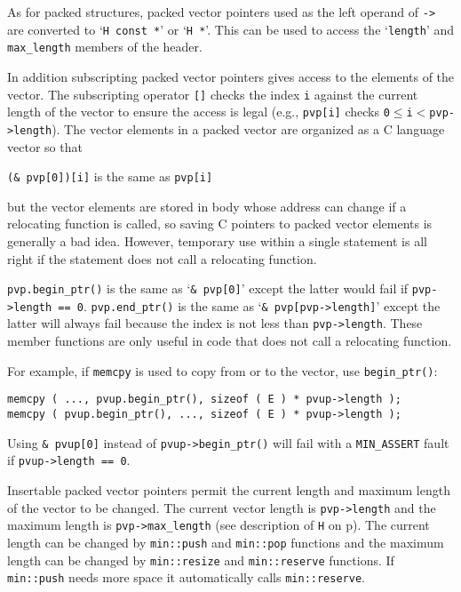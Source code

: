 \documentclass[12pt]{article}
\newcommand{\pagref}[1]{p\pageref{#1}}
\newcommand{\EOL}{\penalty \exhyphenpenalty}
\newenvironment{indpar}[1][0.3in]%
	{\begin{list}{}%
		     {\setlength{\itemsep}{0in}%
		      \setlength{\topsep}{0in}%
		      \setlength{\parsep}{1ex}%
		      \setlength{\labelwidth}{#1}%
		      \setlength{\leftmargin}{#1}%
		      \addtolength{\leftmargin}{\labelsep}}%
	 \item}%
	{\end{list}}
\begin{document}
As for packed structures, packed vector pointers used as the left
operand of \verb|->| are converted to
`\verb|H const *|' or
`\verb|H *|'.  This can be used to access the `\verb|length|'
and \verb|max_length| members of the header.

In addition subscripting packed vector
pointers gives access to the elements of the vector.  The subscripting
operator \verb|[]| checks the index \verb|i| against the current length
of the vector to ensure the access is legal (e.g., \verb|pvp[i]|
checks \verb|0|$\leq$\verb|i|$<$\verb|pvp->length|).
The vector elements in a
packed vector are organized as a C language vector so that
\begin{center}
\verb|(& pvp[0])[i]| is the same as \verb|pvp[i]|
\end{center}
but the vector elements are stored in body whose address can change
if a relocating function is called, so saving C pointers to packed vector
elements is generally a bad idea.  However, temporary use within a single
statement is all right if the statement does not call a relocating
function.

\verb|pvp.begin_ptr()| is the same as `\verb|& pvp[0]|'
except the latter would fail if {\tt pvp->\EOL length == 0}.
\verb|pvp.end_ptr()| is the same as `\verb|& pvp[pvp->length]|'
except the latter will always fail because the index is not less than
\verb|pvp->length|.
These member functions are only useful
in code that does not call a relocating function.

For example, if \verb|memcpy| is used to copy
from or to the vector, use {\tt begin\_\EOL ptr()}:
\begin{indpar}\begin{verbatim}
memcpy ( ..., pvup.begin_ptr(), sizeof ( E ) * pvup->length );
memcpy ( pvup.begin_ptr(), ..., sizeof ( E ) * pvup->length );
\end{verbatim}\end{indpar}
Using \verb|& pvup[0]| instead of \verb|pvup->begin_ptr()|
will fail with a {\tt MIN\_\EOL ASSERT} fault if {\tt pvup->\EOL length == 0}.

Insertable packed vector pointers permit the current length and maximum
length of the vector to be changed.
The current vector length is \verb|pvp->length| and the maximum
length is \verb|pvp->max_length| (see description of \verb|H| on
\pagref{PACKED_VEC_HEADER_TYPE}).
The current length can be changed by {\tt min::\EOL push} and
{\tt min::\EOL pop} functions and the maximum length can be changed
by {\tt min::\EOL resize} and {\tt min::\EOL reserve} functions.  If
{\tt min::\EOL push} needs more space it automatically calls
{\tt min::reserve}.
\end{document}
